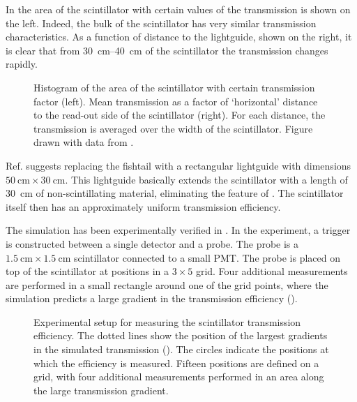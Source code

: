 In  the area of the scintillator
with certain values of the transmission is shown on the left.  Indeed, the
bulk of the scintillator has very similar transmission characteristics.
As a function of distance to the lightguide, shown on the right, it is
clear that from \SIrange{30}{40}{\centi\meter} of the scintillator the
transmission changes rapidly.
\begin{figure}
\centering
{


}
\caption{Histogram of the area of the scintillator with certain
transmission factor (left).  Mean transmission as a factor of `horizontal'
distance to the read-out side of the scintillator (right).  For each
distance, the transmission is averaged over the width of the scintillator.
Figure drawn with data from \cite{Steijger:2010-transmission}.}
\label{fig:transmission-hists}
\end{figure}
Ref. \cite{Steijger:2010-transmission} suggests replacing the fishtail
with a rectangular lightguide with dimensions $\SI{50}{\centi\meter}
\times \SI{30}{\centi\meter}$.  This lightguide basically extends the
scintillator with a length of \SI{30}{\centi\meter} of non-scintillating
material, eliminating the feature of .
The scintillator itself then has an approximately uniform transmission
efficiency.

The simulation has been experimentally verified in \cite{Buisman:2011}. In the
experiment, a trigger is constructed between a single \hisparc detector and a
probe. The probe is a $\SI{1.5}{\centi\meter}\times\SI{1.5}{\centi\meter}$
scintillator connected to a small PMT. The probe is placed on top of the
scintillator at positions in a $3\times 5$ grid. Four additional measurements
are performed in a small rectangle around one of the grid points, where the
simulation predicts a large gradient in the transmission efficiency
().

\begin{figure}
\centering

\caption{Experimental setup for measuring the scintillator transmission
efficiency.  The dotted lines show the position of the largest gradients in the
simulated transmission ().  The circles
indicate the positions at which the efficiency is measured.  Fifteen positions
are defined on a grid, with four additional measurements performed in an area
along the large transmission gradient.}
\label{fig:fishtail-experiment}
\end{figure}

